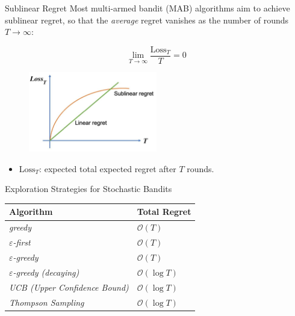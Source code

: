 \documentclass[11pt,table]{beamer}
\begin{document}
\begin{frame}{Sublinear Regret}
Most multi-armed bandit (MAB) algorithms aim to achieve sublinear regret, so that the \textit{average} regret vanishes as the number of rounds $T \to \infty$:

\[
\lim_{T \to \infty} \frac{\text{Loss}_T}{T} = 0
\]

\vspace{1em}
\begin{figure}
	\centering
		\includegraphics[width=0.50\textwidth]{figures/sublinear regret.jpg}
	\label{fig:sublinear regret}
\end{figure}

\begin{itemize}
    \item $\text{Loss}_T$: expected total expected regret after $T$ rounds.
\end{itemize}  
	
\end{frame}


\begin{frame}{Exploration Strategies for Stochastic Bandits}

\renewcommand{\arraystretch}{1.6}
\footnotesize
\begin{table}[H]
\centering
\begin{tabular}{ll}
\toprule
\textbf{Algorithm} &  \textbf{Total Regret}  \\
\midrule
\textit{greedy} &
$\mathcal{O}(T)$ \pause\\

\textit{$\varepsilon$-first} &
$\mathcal{O}(T)$  \pause\\

\textit{$\varepsilon$-greedy} &
$\mathcal{O}(T)$  \pause\\

\textit{$\varepsilon$-greedy (decaying)} &
$\mathcal{O}(\log T)$  \pause\\

\textit{UCB (Upper Confidence Bound)} &
$\mathcal{O}(\log T)$  \pause\\

\textit{Thompson Sampling} &
$\mathcal{O}(\log T)$  \pause\\
\bottomrule
\end{tabular}%
\end{table}
\end{frame}
\end{document}
